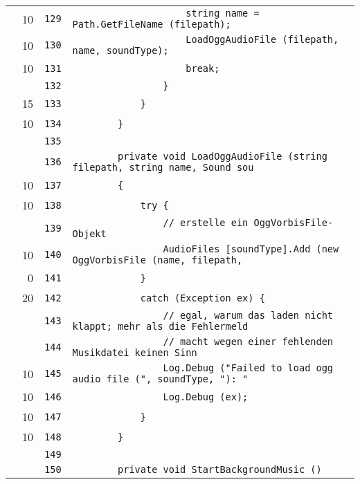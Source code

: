 \documentclass[a4paper,10pt]{article}
\begin{document}
\begin{longtable}[l]{lrrl}
\cellcolor{green} & 10 & \verb~129~ & \verb~                    string name = Path.GetFileName (filepath);~\\
\cellcolor{green} & 10 & \verb~130~ & \verb~                    LoadOggAudioFile (filepath, name, soundType);~\\
\cellcolor{green} & 10 & \verb~131~ & \verb~                    break;~\\
\cellcolor{gray} &  & \verb~132~ & \verb~                }~\\
\cellcolor{green} & 15 & \verb~133~ & \verb~            }~\\
\cellcolor{green} & 10 & \verb~134~ & \verb~        }~\\
\cellcolor{gray} &  & \verb~135~ & \verb~~\\
\cellcolor{gray} &  & \verb~136~ & \verb~        private void LoadOggAudioFile (string filepath, string name, Sound sou~\\
\cellcolor{green} & 10 & \verb~137~ & \verb~        {~\\
\cellcolor{green} & 10 & \verb~138~ & \verb~            try {~\\
\cellcolor{gray} &  & \verb~139~ & \verb~                // erstelle ein OggVorbisFile-Objekt~\\
\cellcolor{green} & 10 & \verb~140~ & \verb~                AudioFiles [soundType].Add (new OggVorbisFile (name, filepath,~\\
\cellcolor{red} & 0 & \verb~141~ & \verb~            }~\\
\cellcolor{green} & 20 & \verb~142~ & \verb~            catch (Exception ex) {~\\
\cellcolor{gray} &  & \verb~143~ & \verb~                // egal, warum das laden nicht klappt; mehr als die Fehlermeld~\\
\cellcolor{gray} &  & \verb~144~ & \verb~                // macht wegen einer fehlenden Musikdatei keinen Sinn~\\
\cellcolor{green} & 10 & \verb~145~ & \verb~                Log.Debug ("Failed to load ogg audio file (", soundType, "): "~\\
\cellcolor{green} & 10 & \verb~146~ & \verb~                Log.Debug (ex);~\\
\cellcolor{green} & 10 & \verb~147~ & \verb~            }~\\
\cellcolor{green} & 10 & \verb~148~ & \verb~        }~\\
\cellcolor{gray} &  & \verb~149~ & \verb~~\\
\cellcolor{gray} &  & \verb~150~ & \verb~        private void StartBackgroundMusic ()~\\

\end{longtable}
\end{document}
